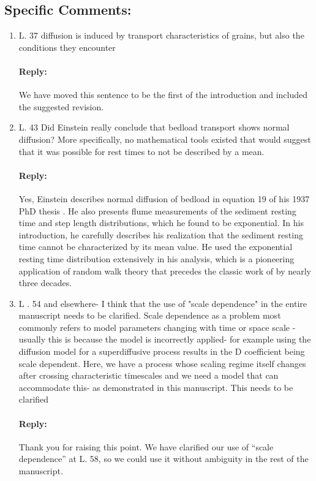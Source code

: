 \documentclass[11pt]{article}
\begin{document}
\subsection*{Specific Comments:}
\begin{enumerate}
\item L. 37 diffusion is induced by transport characteristics of grains, but also the conditions they encounter

\paragraph{Reply:} We have moved this sentence to be the first of the introduction and included the suggested revision.

\item L. 43 Did Einstein really conclude that bedload transport shows normal diffusion? More specifically, no mathematical tools existed that would suggest that it was possible for rest times to not be described by a mean.

\paragraph{Reply:} Yes, Einstein describes normal diffusion of bedload in equation 19 of his 1937 PhD thesis \citep{Einstein1937}.
He also presents flume measurements of the sediment resting time and step length distributions, which he found to be exponential. In his introduction, he carefully describes his realization that the sediment resting time cannot be characterized by its mean value. He used the exponential resting time distribution extensively in his analysis, which is a pioneering application of random walk theory that precedes the classic work of \citet{Montroll1965} by nearly three decades.

\item L . 54 and elsewhere- I think that the use of "scale dependence" in the entire manuscript needs to be clarified. Scale dependence as a problem most commonly refers to model parameters changing with time or space scale - usually this is because the model is incorrectly applied- for example using the diffusion model for a superdiffusive process results in the D coefficient being scale dependent. Here, we have a process whose scaling regime itself changes after crossing characteristic timescales and we need a model that can accommodate this- as demonstrated in this manuscript. This needs to be clarified
\paragraph{Reply:} Thank you for raising this point. We have clarified our use of ``scale dependence'' at L. 58, so we could use it without ambiguity in the rest of the manuscript.


\end{enumerate}
\end{document}
